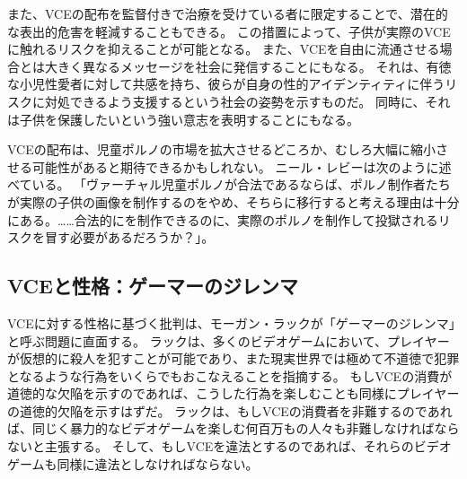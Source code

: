 \documentclass[paper=a4,book,openany]{jlreq}
\newcommand{\ig}[1]{}           %
\begin{document}
また、VCEの配布を監督付きで治療を受けている者に限定することで、潜在的な表出的危害を軽減することもできる。
この措置によって、子供が実際のVCEに触れるリスクを抑えることが可能となる。
また、VCEを自由に流通させる場合とは大きく異なるメッセージを社会に発信することにもなる。
それは、有徳な小児性愛者に対して共感を持ち、彼らが自身の性的アイデンティティに伴うリスクに対処できるよう支援するという社会の姿勢を示すものだ。
同時に、それは子供を保護したいという強い意志を表明することにもなる。

VCEの配布は、児童ポルノの市場を拡大させるどころか、むしろ大幅に縮小させる可能性があると期待できるかもしれない。
ニール・レビーは次のように述べている。
「ヴァーチャル児童ポルノが合法であるならば、ポルノ制作者たちが実際の子供の画像を制作するのをやめ、そちらに移行すると考える理由は十分にある。……合法的にを制作できるのに、実際のポルノを制作して投獄されるリスクを冒す必要があるだろうか？」\citep[p.320]{levy02:_virtual_child_pornog}\ig{Neil Levy}。

\subsection{VCEと性格：ゲーマーのジレンマ}

VCEに対する性格に基づく批判は、モーガン・ラックが「ゲーマーのジレンマ」と呼ぶ問題に直面する。
ラックは、多くのビデオゲームにおいて、プレイヤーが仮想的に殺人を犯すことが可能であり、また現実世界では極めて不道徳で犯罪となるような行為をいくらでもおこなえることを指摘する。
もしVCEの消費が道徳的な欠陥を示すのであれば、こうした行為を楽しむことも同様にプレイヤーの道徳的欠陥を示すはずだ。
ラックは、もしVCEの消費者を非難するのであれば、同じく暴力的なビデオゲームを楽しむ何百万もの人々も非難しなければならないと主張する。
そして、もしVCEを違法とするのであれば、それらのビデオゲームも同様に違法としなければならない\citep{luck09:_gamer_dilem}。
\end{document}
